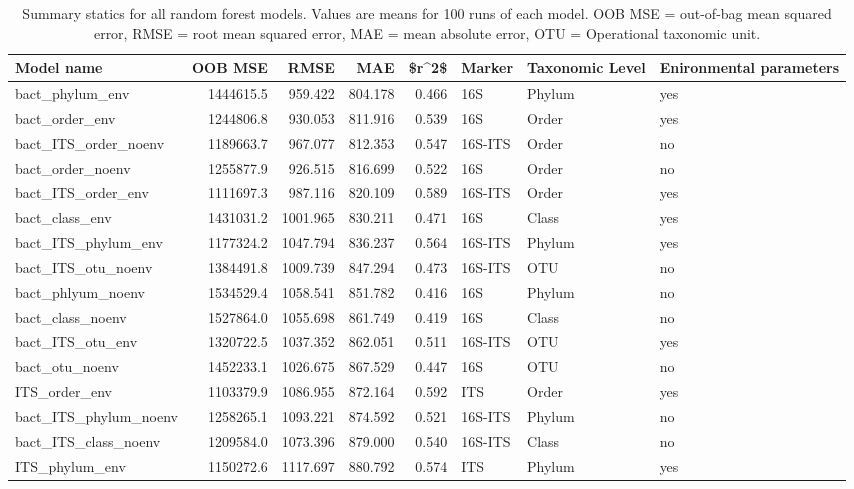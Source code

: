 \documentclass[
  10pt,
  letterpaper,
]{article}
\begin{document}
\linenumbers\hypertarget{tbl-modelsummary}{}
\begin{table}
\caption{\label{tbl-modelsummary}Summary statics for all random forest models. Values are means for 100
runs of each model. OOB MSE = out-of-bag mean squared error, RMSE = root
mean squared error, MAE = mean absolute error, OTU = Operational
taxonomic unit. }\tabularnewline

\centering
\begin{tabular}[t]{lrrrrlll}
\toprule
Model name & OOB MSE & RMSE & MAE & \$r\textasciicircum{}2\$ & Marker & Taxonomic Level & Enironmental parameters\\
\midrule
bact\_phylum\_env & 1444615.5 & 959.422 & 804.178 & 0.466 & 16S & Phylum & yes\\
bact\_order\_env & 1244806.8 & 930.053 & 811.916 & 0.539 & 16S & Order & yes\\
bact\_ITS\_order\_noenv & 1189663.7 & 967.077 & 812.353 & 0.547 & 16S-ITS & Order & no\\
bact\_order\_noenv & 1255877.9 & 926.515 & 816.699 & 0.522 & 16S & Order & no\\
bact\_ITS\_order\_env & 1111697.3 & 987.116 & 820.109 & 0.589 & 16S-ITS & Order & yes\\
\addlinespace
bact\_class\_env & 1431031.2 & 1001.965 & 830.211 & 0.471 & 16S & Class & yes\\
bact\_ITS\_phylum\_env & 1177324.2 & 1047.794 & 836.237 & 0.564 & 16S-ITS & Phylum & yes\\
bact\_ITS\_otu\_noenv & 1384491.8 & 1009.739 & 847.294 & 0.473 & 16S-ITS & OTU & no\\
bact\_phlyum\_noenv & 1534529.4 & 1058.541 & 851.782 & 0.416 & 16S & Phylum & no\\
bact\_class\_noenv & 1527864.0 & 1055.698 & 861.749 & 0.419 & 16S & Class & no\\
\addlinespace
bact\_ITS\_otu\_env & 1320722.5 & 1037.352 & 862.051 & 0.511 & 16S-ITS & OTU & yes\\
bact\_otu\_noenv & 1452233.1 & 1026.675 & 867.529 & 0.447 & 16S & OTU & no\\
ITS\_order\_env & 1103379.9 & 1086.955 & 872.164 & 0.592 & ITS & Order & yes\\
bact\_ITS\_phylum\_noenv & 1258265.1 & 1093.221 & 874.592 & 0.521 & 16S-ITS & Phylum & no\\
bact\_ITS\_class\_noenv & 1209584.0 & 1073.396 & 879.000 & 0.540 & 16S-ITS & Class & no\\
\addlinespace
ITS\_phylum\_env & 1150272.6 & 1117.697 & 880.792 & 0.574 & ITS & Phylum & yes\\

\end{tabular}
\end{table}
\end{document}
